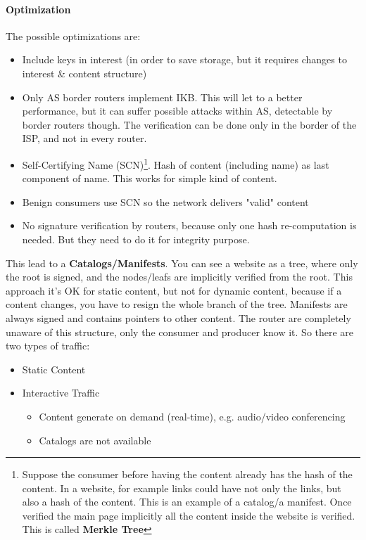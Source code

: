 \paragraph*{Optimization} The possible optimizations are:
\begin{itemize}
  \item Include keys in interest (in order to save storage, but it requires
changes to interest \& content structure)
  \item Only AS border routers implement IKB. This will let to a better
performance, but it can suffer possible attacks within AS, detectable by
border routers though. The verification can be done only in the border of the
ISP, and not in every router.
  \item Self-Certifying Name (SCN)\footnote{Suppose the consumer before having
the content already has the hash of the content. In a website, for example
links could have not only the links, but also a hash of the content. This is an
example of a catalog/a manifest. Once verified the main page implicitly all the
content inside the website is verified. This is called \textbf{Merkle Tree}}.
Hash of content (including name) as last component of name. This works for
simple kind of content.
  \item Benign consumers use SCN so the network delivers "valid" content
  \item No signature verification by routers, because only one hash
re-computation is needed. But they need to do it for integrity purpose.
\end{itemize}

This lead to a \textbf{Catalogs/Manifests}. You can see a website as a tree,
where only the root is signed, and the nodes/leafs are implicitly verified from
the root. This approach it's OK for static content, but not for dynamic
content, because if a content changes, you have to resign the whole branch of
the tree.
Manifests are always signed and contains pointers to other content. The router
are completely unaware of this structure, only the consumer and producer know
it.
So there are two types of traffic:
\begin{itemize}
  \item Static Content
  \item Interactive Traffic
  \begin{itemize}
    \item Content generate on demand (real-time), e.g. audio/video conferencing
    \item Catalogs are not available
  \end{itemize}
\end{itemize}

